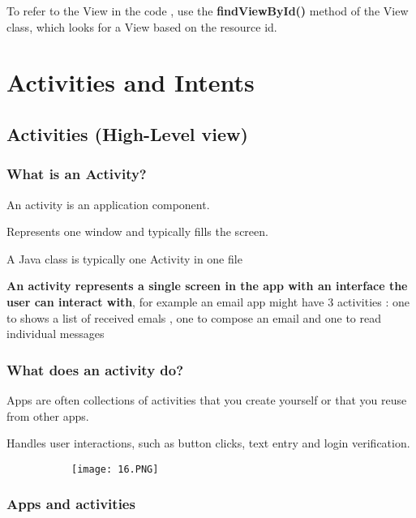 \documentclass{article}
\begin{document}
To refer to the View in the code , use the \textbf{findViewById()} method of the View class, which looks for a View based on the resource id.

\section{Activities and Intents}

\subsection{Activities (High-Level view)}

\subsubsection{What is an Activity?}

An activity is an application component.

Represents one window and typically fills the screen.

A Java class is typically one Activity in one file

\textbf{An activity represents a single screen in the app with an interface the user can interact with}, for example an email app might have 3 activities : one to shows a list of received emals , one to compose an email and one to read individual messages

\subsubsection{What does an activity do?}

Apps are often collections of activities that you create yourself or that you reuse from other apps.

Handles user interactions, such as button clicks, text entry and login verification.

    \begin{figure}[ht!]
  \centering
  \begin{subfigure}[b]{0.5\linewidth}
    \texttt{[image: 16.PNG]}
  \end{subfigure}
  \end{figure}

  \vspace{40mm}

  \subsubsection{Apps and activities}
\end{document}
